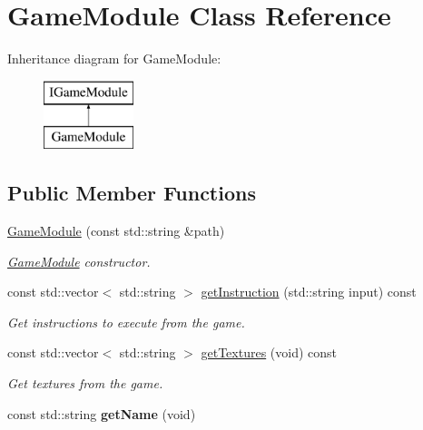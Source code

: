 \hypertarget{class_game_module}{}\section{Game\+Module Class Reference}
\label{class_game_module}
Inheritance diagram for Game\+Module\+:\begin{figure}[H]
\begin{center}
\leavevmode
\includegraphics[height=2.000000cm]{class_game_module}
\end{center}
\end{figure}
\subsection*{Public Member Functions}
\begin{DoxyCompactItemize}
\item 
\hyperlink{class_game_module_a9d2cc872e80e4107d7f87818e9ea5455}{Game\+Module} (const std\+::string \&path)
\begin{DoxyCompactList}\small\item\em \hyperlink{class_game_module}{Game\+Module} constructor. \end{DoxyCompactList}\item 
const std\+::vector$<$ std\+::string $>$ \hyperlink{class_game_module_ab82644e3a4e4a5aa41c4f8e9c6077af7}{get\+Instruction} (std\+::string input) const
\begin{DoxyCompactList}\small\item\em Get instructions to execute from the game. \end{DoxyCompactList}\item 
const std\+::vector$<$ std\+::string $>$ \hyperlink{class_game_module_a54c7d41e2ddf42b1c46846f2653ad746}{get\+Textures} (void) const
\begin{DoxyCompactList}\small\item\em Get textures from the game. \end{DoxyCompactList}\item 
\mbox{\label{class_game_module_a475400a8ee4a8183e3639c6cbeda47b1}} 
const std\+::string {\bfseries get\+Name} (void)
\end{DoxyCompactItemize}


